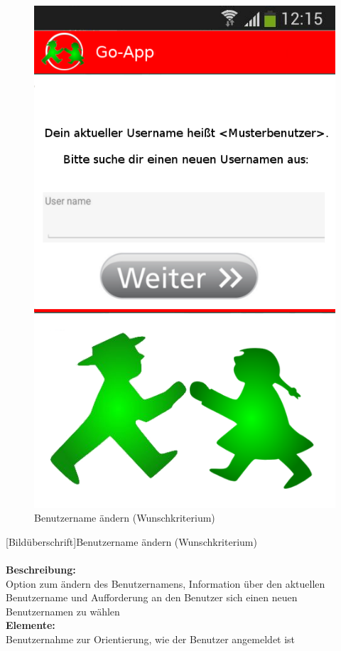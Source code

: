 \begin{figure} [H]
	\caption{Benutzername ändern (Wunschkriterium)}
	\includegraphics[scale =0.5]{resources/images/username_aendern.png}
\end{figure}
[Bildüberschrift]Benutzername ändern (Wunschkriterium)\\ \\
\textbf{Beschreibung:}\\
Option zum ändern des Benutzernamens, Information über den aktuellen Benutzername und Aufforderung an den Benutzer sich einen neuen Benutzernamen zu wählen\\
\textbf{Elemente:}\\
Benutzernahme zur Orientierung, wie der Benutzer angemeldet ist\\
